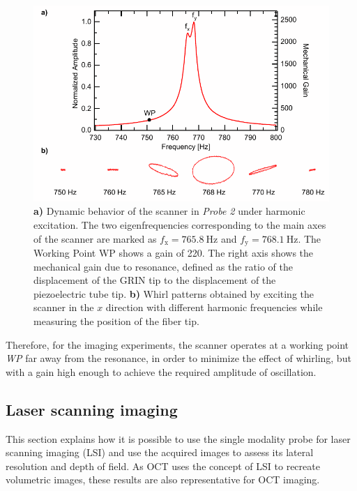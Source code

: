 \documentclass[10pt]{iopart}
\begin{document}
\begin{figure}[h!]\centering \includegraphics[width=\columnwidth]{figures/bodeWhirl.pdf}
      \caption{\textbf{a)} Dynamic behavior of the scanner in \textit{Probe 2} under harmonic excitation. The two eigenfrequencies corresponding to the main axes of the scanner are marked as $f_\mathrm{x} = \SI{765.8}{\hertz}$ and $f_\mathrm{y} = \SI{768.1}{\hertz}$.
      The Working Point WP shows a gain of 220. 
      The right axis shows the mechanical gain due to resonance, defined as the ratio of the displacement of the GRIN tip to the displacement of the piezoelectric tube tip.
      \textbf{b)} Whirl patterns obtained by exciting the scanner in the $x$ direction with different harmonic frequencies while measuring the position of the fiber tip. }
      \label{fig:bode}
\end{figure}

Therefore, for the imaging experiments, the scanner operates at a working point \textit{WP} far away from the resonance, in order to minimize the effect of whirling, but with a gain high enough to achieve the required amplitude of oscillation.


\subsection{Laser scanning imaging}
This section explains how it is possible to use the single modality probe for laser scanning imaging (LSI) and use the acquired images to assess its lateral resolution and depth of field. As OCT uses the concept of LSI to recreate volumetric images, these results are also representative for OCT imaging.
\end{document}
